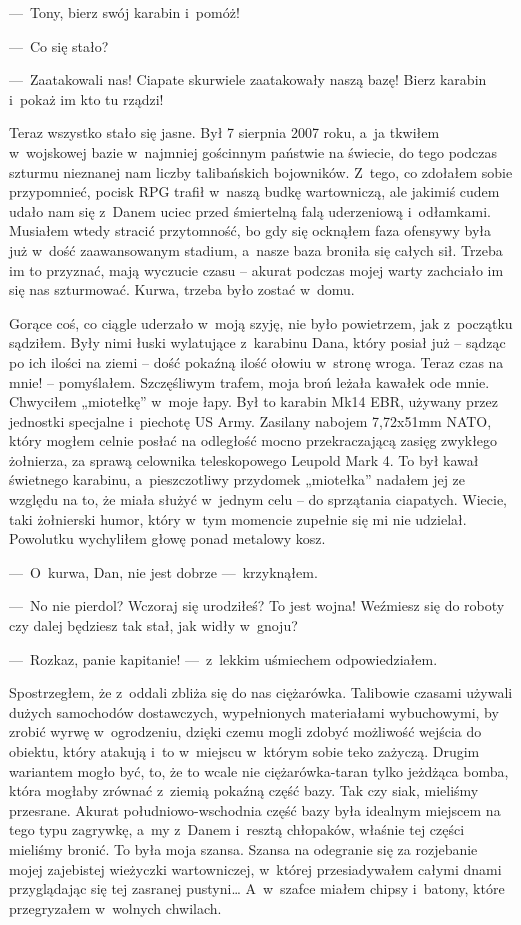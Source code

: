 ---~Tony, bierz swój karabin i~pomóż!

---~Co się stało?

---~Zaatakowali nas! Ciapate skurwiele zaatakowały naszą bazę! Bierz karabin i~pokaż im kto tu rządzi!

Teraz wszystko stało się jasne. Był 7 sierpnia 2007 roku, a~ja tkwiłem w~wojskowej bazie w~najmniej gościnnym państwie na świecie, do tego podczas szturmu nieznanej nam liczby talibańskich bojowników. Z~tego, co zdołałem sobie przypomnieć, pocisk RPG trafił w~naszą budkę wartowniczą, ale jakimiś cudem udało nam się z~Danem uciec przed śmiertelną falą uderzeniową i~odłamkami. Musiałem wtedy stracić przytomność, bo gdy się ocknąłem faza ofensywy była już w~dość zaawansowanym stadium, a~nasze baza broniła się całych sił. Trzeba im to przyznać, mają wyczucie czasu -- akurat podczas mojej warty zachciało im się nas szturmować. Kurwa, trzeba było zostać w~domu.

Gorące coś, co ciągle uderzało w~moją szyję, nie było powietrzem, jak z~początku sądziłem. Były nimi łuski wylatujące z~karabinu Dana, który posiał już -- sądząc po ich ilości na ziemi -- dość pokaźną ilość ołowiu w~stronę wroga. Teraz czas na mnie! -- pomyślałem. Szczęśliwym trafem, moja broń leżała kawałek ode mnie. Chwyciłem „miotełkę” w~moje łapy. Był to karabin Mk14 EBR, używany przez jednostki specjalne i~piechotę US Army. Zasilany nabojem 7,72x51mm NATO, który mogłem celnie posłać na odległość mocno przekraczającą zasięg zwykłego żołnierza, za sprawą celownika teleskopowego Leupold Mark 4.  To był kawał świetnego karabinu, a~pieszczotliwy przydomek „miotełka” nadałem jej ze względu na to, że miała służyć w~jednym celu -- do sprzątania ciapatych. Wiecie, taki żołnierski humor, który w~tym momencie zupełnie się mi nie udzielał. Powolutku wychyliłem głowę ponad metalowy kosz. 

---~O~kurwa, Dan, nie jest dobrze ---~krzyknąłem.

---~No nie pierdol? Wczoraj się urodziłeś? To jest wojna! Weźmiesz się do roboty czy dalej będziesz tak stał, jak widły w~gnoju?

---~Rozkaz, panie kapitanie! ---~z~lekkim uśmiechem odpowiedziałem.

Spostrzegłem, że z~oddali zbliża się do nas ciężarówka. Talibowie czasami używali dużych samochodów dostawczych, wypełnionych materiałami wybuchowymi, by zrobić wyrwę w~ogrodzeniu, dzięki czemu mogli zdobyć możliwość wejścia do obiektu, który atakują i~to w~miejscu w~którym sobie teko zażyczą. Drugim wariantem mogło być, to, że to wcale nie ciężarówka-taran tylko jeżdżąca bomba, która mogłaby zrównać z~ziemią pokaźną część bazy. Tak czy siak, mieliśmy przesrane. Akurat południowo-wschodnia część bazy była idealnym miejscem na tego typu zagrywkę, a~my z~Danem i~resztą chłopaków, właśnie tej części mieliśmy bronić. To była moja szansa. Szansa na odegranie się za rozjebanie mojej zajebistej wieżyczki wartowniczej, w~której przesiadywałem całymi dnami przyglądając się tej zasranej pustyni… A~w~szafce miałem chipsy i~batony, które przegryzałem w~wolnych chwilach. 

